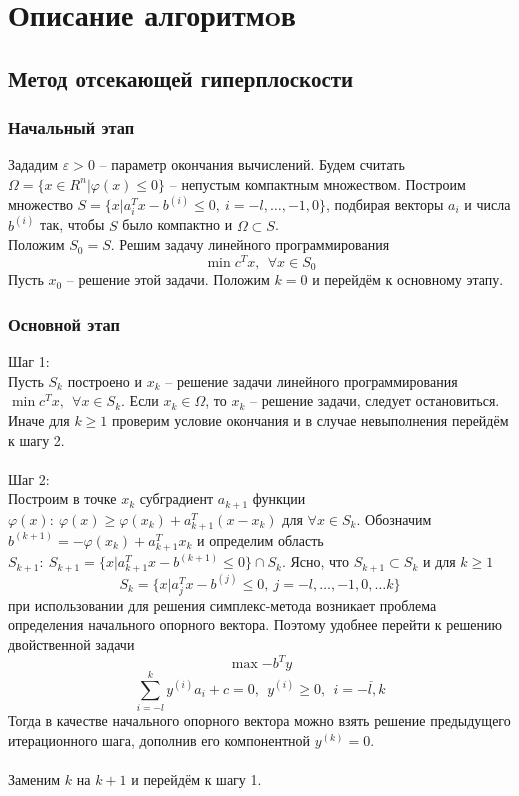 \documentclass{article}
\begin{document}
\section{Описание алгоритмoв}
\subsection{Метод отсекающей гиперплоскости}
\subsubsection{Начальный этап}
\noindent Зададим $\varepsilon>0$ -- параметр окончания вычислений. Будем считать $\Omega=\{x \in R^{n}| \varphi(x) \le 0 \}$ -- непустым компактным множеством. Построим множество $S=\{x|a_i^{T}x-b^{(i)} \le 0, ~i=-l,\dots, -1, 0 \}$, подбирая векторы $a_i$ и числа $b^{(i)}$ так, чтобы $S$ было компактно и $\Omega \subset S$.\\
Положим $S_0=S$. Решим задачу линейного программирования $$\min{c^{T}x},~~\forall x \in S_0$$ Пусть $x_0$ -- решение этой задачи. Положим $k=0$ и перейдём к основному этапу.

\subsubsection{Основной этап}
\noindent Шаг 1:\\
Пусть $S_k$ построено и $x_k$ -- решение задачи линейного программирования $\min{c^{T}x},~~\forall x \in S_k$. Если $x_k \in \Omega$, то $x_k$ -- решение задачи,  следует остановиться. Иначе для $k \ge 1$ проверим условие окончания и в случае невыполнения перейдём к шагу 2.\\\\

\noindent Шаг 2:\\
Построим в точке $x_k$ субградиент $a_{k+1}$ функции $\varphi(x):~ \varphi(x) \ge \varphi(x_k) + a_{k+1}^T (x-x_k)$ для $\forall x \in S_k$. Обозначим $b^{(k+1)}=-\varphi(x_k)+a_{k+1}^T x_k$ и определим область $S_{k+1}:~S_{k+1}=\{x| a_{k+1}^T x - b^{(k+1)} \le 0 \} \cap S_k$. Ясно, что $S_{k+1} \subset S_k$ и для $k\ge 1$
$$S_k=\{x| a_j^{T}x - b^{(j)} \le 0,~j=-l, \dots , -1,0, \dots k \}$$
при использовании для решения симплекс-метода возникает проблема определения начального опорного вектора. Поэтому удобнее перейти к решению двойственной задачи
$$\max{-b^{T}y}$$
$$\sum_{i=-l}^{k} y^{(i)}a_i + c = 0,~~y^{(i)}\ge 0,~~i=\overline{-l,k}$$
Тогда в качестве начального опорного вектора можно взять решение предыдущего итерационного шага, дополнив его компонентной $y^{(k)}=0$.\\\\ 
Заменим $k$ на $k+1$ и перейдём к шагу 1.
\end{document}
